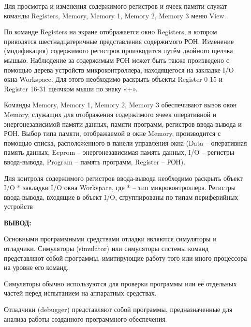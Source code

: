 \documentclass[14pt,a4paper]{extreport}
\newcommand{\header}[1]{%
{
\clearpage%
\fontsize{16pt}{14pt}\selectfont
\begin{center}
\textbf{\MakeUppercase{#1}:}
\end{center}
}
}
\begin{document}
\vspace{30pt}

	Для просмотра и изменения содержимого регистров и ячеек памяти служат команды Registers, Memory, Memory 1, Memory 2, Memory 3 меню View.

	По команде Registers на экране отображается окно Registers, в котором приводятся шестнадцатеричные представления содержимого РОН. Изменение (модификация) содержимого регистров производится путём двойного щелчка мышью. Наблюдение за содержимым РОН может быть также произведено с помощью дерева устройств микроконтроллера, находящегося на закладке I/O окна Workspace. Для этого необходимо раскрыть объекты Register 0-15 и
Register 16-31 щелчком мыши по знаку «+».
	
	Команды Memory, Memory 1, Memory 2, Memory 3 обеспечивают вызов окон Memory, служащих для отображения содержимого ячеек оперативной и энергонезависимой памяти данных, памяти программ, регистров ввода-вывода и РОН. Выбор типа памяти, отображаемой в окне Memory, производится с помощью списка, расположенного в панели управления окна (Data – оперативная память данных, Eeprom – энергонезависимая память данных, I/O – регистры ввода-вывода, Program – память программ, Register – РОН).
	
	Для контроля содержимого регистров ввода-вывода необходимо раскрыть объект I/O * закладки I/O окна Workspace, где * – тип микроконтроллера. Регистры ввода-вывода, входящие в объект I/O, сгруппированы по типам периферийных устройств

\header{Вывод}

	Основными программными средствами отладки являются симуляторы и отладчики. Симуляторы (simulator) или симуляторы системы команд представляют собой программы, имитирующие работу того или иного процессора на уровне его команд. 
	
	Симуляторы обычно используются для проверки программы или её отдельных частей перед испытанием на аппаратных средствах. 
	
	Отладчики (debugger) представляют собой программы, предназначенные для анализа работы созданного программного обеспечения.
\end{document}
